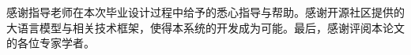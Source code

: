 \documentclass[type = bachelor]{whu-thesis}
\begin{document}
\tableofcontents %

\mainmatter









\nocite{*}
\printbibliography

\begin{acknowledgements}
  感谢指导老师在本次毕业设计过程中给予的悉心指导与帮助。感谢开源社区提供的大语言模型与相关技术框架，使得本系统的开发成为可能。最后，感谢评阅本论文的各位专家学者。
\end{acknowledgements}
\end{document}
